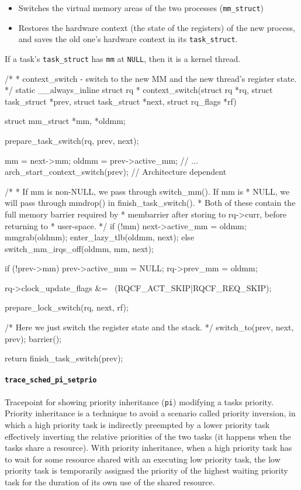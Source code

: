 \begin{itemize}
    \item Switches the virtual memory areas of the two processes (\verb|mm_struct|)
    \item Restores the hardware context (the state of the registers) of the new process, and saves the old one's hardware context in its \verb|task_struct|.
\end{itemize}
If a task's \verb|task_struct| has \verb|mm| at \verb|NULL|, then it is a kernel thread.\label{sec:context_switch}
\begin{code}
/*
 * context_switch - switch to the new MM and the new thread's register state.
 */
static __always_inline struct rq *
context_switch(struct rq *rq, struct task_struct *prev,
	       struct task_struct *next, struct rq_flags *rf) {
	struct mm_struct *mm, *oldmm;

	prepare_task_switch(rq, prev, next);

	mm = next->mm;
	oldmm = prev->active_mm;
        // ...
	arch_start_context_switch(prev); // Architecture dependent

	/*
	 * If mm is non-NULL, we pass through switch_mm(). If mm is
	 * NULL, we will pass through mmdrop() in finish_task_switch().
	 * Both of these contain the full memory barrier required by
	 * membarrier after storing to rq->curr, before returning to
	 * user-space.
	 */
	if (!mm) {
		next->active_mm = oldmm;
		mmgrab(oldmm);
		enter_lazy_tlb(oldmm, next);
	} else
		switch_mm_irqs_off(oldmm, mm, next);

	if (!prev->mm) {
		prev->active_mm = NULL;
		rq->prev_mm = oldmm;
	}

	rq->clock_update_flags &= ~(RQCF_ACT_SKIP|RQCF_REQ_SKIP);

	prepare_lock_switch(rq, next, rf);

	/* Here we just switch the register state and the stack. */
	switch_to(prev, next, prev);
	barrier();

	return finish_task_switch(prev);
}
\end{code}

\paragraph{\texttt{trace\_sched\_pi\_setprio}}
Tracepoint for showing priority inheritance (\verb|pi|) modifying a tasks priority. Priority inheritance is a technique to avoid a scenario called priority inversion, in which a high priority task is indirectly preempted by a lower priority task effectively inverting the relative priorities of the two tasks (it happens when the tasks share a resource). With priority inheritance, when a high priority task has to wait for some resource shared with an executing low priority task, the low priority task is temporarily assigned the priority of the highest waiting priority task for the duration of its own use of the shared resource.


